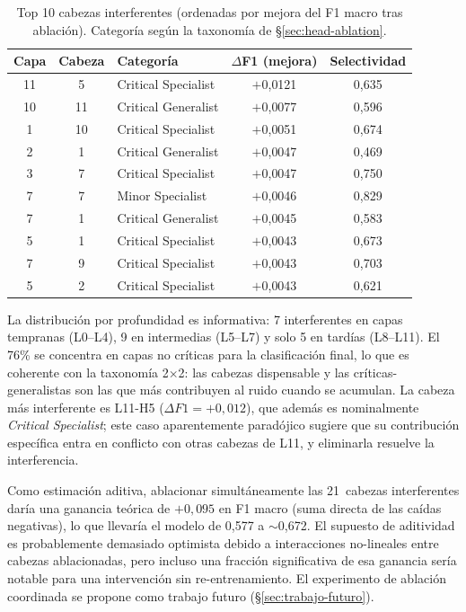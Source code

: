 \begin{table}[ht]
\centering
\caption{Top 10 cabezas interferentes (ordenadas por mejora del F1
macro tras ablación). Categoría según la taxonomía de
\S\ref{sec:head-ablation}.}
\label{tab:cabezas-interferentes}
\small
\begin{tabular}{c c l c c}
\toprule
\textbf{Capa} & \textbf{Cabeza} & \textbf{Categoría} & \textbf{$\Delta$F1 (mejora)} & \textbf{Selectividad} \\
\midrule
11 &  5 & Critical Specialist  & $+$0{,}0121 & 0{,}635 \\
10 & 11 & Critical Generalist  & $+$0{,}0077 & 0{,}596 \\
 1 & 10 & Critical Specialist  & $+$0{,}0051 & 0{,}674 \\
 2 &  1 & Critical Generalist  & $+$0{,}0047 & 0{,}469 \\
 3 &  7 & Critical Specialist  & $+$0{,}0047 & 0{,}750 \\
 7 &  7 & Minor Specialist     & $+$0{,}0046 & 0{,}829 \\
 7 &  1 & Critical Generalist  & $+$0{,}0045 & 0{,}583 \\
 5 &  1 & Critical Specialist  & $+$0{,}0043 & 0{,}673 \\
 7 &  9 & Critical Specialist  & $+$0{,}0043 & 0{,}703 \\
 5 &  2 & Critical Specialist  & $+$0{,}0043 & 0{,}621 \\
\bottomrule
\end{tabular}
\end{table}

La distribución por profundidad es informativa: 7 interferentes en
capas tempranas (L0--L4), 9 en intermedias (L5--L7) y solo 5 en
tardías (L8--L11). El 76\% se concentra en capas no críticas para la
clasificación final, lo que es coherente con la taxonomía
2$\times$2: las cabezas dispensable y las críticas-generalistas son
las que más contribuyen al ruido cuando se acumulan. La cabeza más
interferente es L11-H5 ($\Delta F1 = +0{,}012$), que además es
nominalmente \emph{Critical Specialist}; este caso aparentemente
paradójico sugiere que su contribución específica entra en conflicto con
otras cabezas de L11, y eliminarla resuelve la interferencia.

Como estimación aditiva, ablacionar simultáneamente las 21~cabezas
interferentes daría una ganancia teórica de $+0{,}095$ en F1 macro
(suma directa de las caídas negativas), lo que llevaría el modelo de
0{,}577 a $\sim$0{,}672. El supuesto de aditividad es probablemente
demasiado optimista debido a interacciones no-lineales entre cabezas
ablacionadas, pero incluso una fracción significativa de esa ganancia
sería notable para una intervención sin re-entrenamiento. El
experimento de ablación coordinada se propone como trabajo futuro
(\S\ref{sec:trabajo-futuro}).

